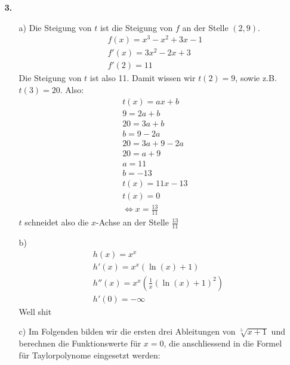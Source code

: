 \documentclass[a4paper,11pt]{article}
\begin{document}
\begin{enumerate}
        \item[\textbf{3.}]
            \begin{enumerate}
                \item[a)]
                    Die Steigung von $t$ ist die Steigung von $f$ an der Stelle $(2,9)$.
                    \begin{align*}
                        f(x)=x^3-x^2+3x-1\\
                        f'(x)=3x^2-2x+3\\
                        f'(2)=11
                    \end{align*}
                    Die Steigung von $t$ ist also 11. Damit wissen wir $t(2)=9$, sowie z.B. $t(3)=20$. Also:
                    \begin{align*}
                        t(x)=ax+b\\
                        9=2a+b\\
                        20=3a+b\\
                        b=9-2a\\
                        20=3a+9-2a\\
                        20=a+9\\
                        a=11\\
                        b=-13\\
                        t(x)=11x-13\\
                        t(x)=0\\
                        \Leftrightarrow x=\frac{13}{11}
                    \end{align*}
                    $t$ schneidet also die $x$-Achse an der Stelle $\frac{13}{11}$
                \item[b)]
                    \begin{align*}
                        &h(x)=x^x\\
                        &h'(x)=x^x (\ln(x)+1)\\
                        &h''(x)=x^x \left( \frac{1}{x} (\ln(x)+1)^2 \right)\\
                        &h'(0)=- \infty
                    \end{align*}
                    Well shit
                    \newpage 
                \item[c)]
                    Im Folgenden bilden wir die ersten drei Ableitungen von $\sqrt[5]{x+1}$ und berechnen die Funktionswerte für $x = 0$,
                    die anschliessend in die Formel für Taylorpolynome eingesetzt werden:

\end{enumerate}
\end{enumerate}
\end{document}
